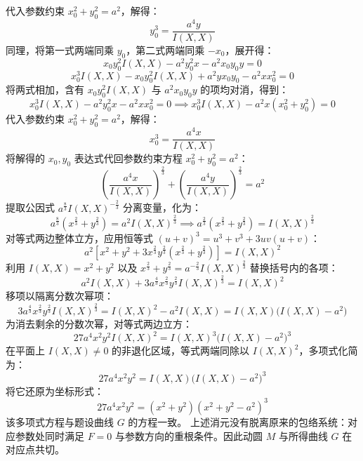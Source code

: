 \begin{solution}
代入参数约束 $x_0^2 + y_0^2 = a^2$，解得：
$$ y_0^3 = \frac{a^4 y}{I(X, X)} $$
同理，将第一式两端同乘 $y_0$，第二式两端同乘 $-x_0$，展开得：
$$ x_0 y_0^2 I(X, X) - a^2 y_0^2 x - a^2 x_0 y_0 y = 0 $$
$$ x_0^3 I(X, X) - x_0 y_0^2 I(X, X) + a^2 y x_0 y_0 - a^2 x x_0^2 = 0 $$
将两式相加，含有 $x_0 y_0^2 I(X, X)$ 与 $a^2 x_0 y_0 y$ 的项均对消，得到：
$$ x_0^3 I(X, X) - a^2 y_0^2 x - a^2 x x_0^2 = 0 \implies x_0^3 I(X, X) - a^2 x (x_0^2 + y_0^2) = 0 $$
代入参数约束 $x_0^2 + y_0^2 = a^2$，解得：
$$ x_0^3 = \frac{a^4 x}{I(X, X)} $$
将解得的 $x_0, y_0$ 表达式代回参数约束方程 $x_0^2 + y_0^2 = a^2$：
$$ \left( \frac{a^4 x}{I(X, X)} \right)^{\frac{2}{3}} + \left( \frac{a^4 y}{I(X, X)} \right)^{\frac{2}{3}} = a^2 $$
提取公因式 $a^{\frac{8}{3}} I(X, X)^{-\frac{2}{3}}$ 分离变量，化为：
$$ a^{\frac{8}{3}} \left(x^{\frac{2}{3}} + y^{\frac{2}{3}}\right) = a^2 I(X, X)^{\frac{2}{3}} \implies a^{\frac{2}{3}} \left(x^{\frac{2}{3}} + y^{\frac{2}{3}}\right) = I(X, X)^{\frac{2}{3}} $$
对等式两边整体立方，应用恒等式 $(u+v)^3 = u^3 + v^3 + 3uv(u+v)$：
$$ a^2 \left[ x^2 + y^2 + 3 x^{\frac{2}{3}} y^{\frac{2}{3}} \left(x^{\frac{2}{3}} + y^{\frac{2}{3}}\right) \right] = I(X, X)^2 $$
利用 $I(X, X) = x^2 + y^2$ 以及 $x^{\frac{2}{3}} + y^{\frac{2}{3}} = a^{-\frac{2}{3}} I(X, X)^{\frac{2}{3}}$ 替换括号内的各项：
$$ a^2 I(X, X) + 3 a^{\frac{4}{3}} x^{\frac{2}{3}} y^{\frac{2}{3}} I(X, X)^{\frac{2}{3}} = I(X, X)^2 $$
移项以隔离分数次幂项：
$$ 3 a^{\frac{4}{3}} x^{\frac{2}{3}} y^{\frac{2}{3}} I(X, X)^{\frac{2}{3}} = I(X, X)^2 - a^2 I(X, X) = I(X, X) \big( I(X, X) - a^2 \big) $$
为消去剩余的分数次幂，对等式两边立方：
$$ 27 a^4 x^2 y^2 I(X, X)^2 = I(X, X)^3 \big( I(X, X) - a^2 \big)^3 $$
在平面上 $I(X, X) \neq 0$ 的非退化区域，等式两端同除以 $I(X, X)^2$，多项式化简为：
$$ 27 a^4 x^2 y^2 = I(X, X) \big( I(X, X) - a^2 \big)^3 $$
将它还原为坐标形式：
$$ 27 a^4 x^2 y^2 = (x^2 + y^2) (x^2 + y^2 - a^2)^3 $$
该多项式方程与题设曲线 $G$ 的方程一致。
上述消元没有脱离原来的包络系统：对应参数处同时满足 $F=0$ 与参数方向的重根条件。因此动圆 $M$ 与所得曲线 $G$ 在对应点共切。
\end{solution}


